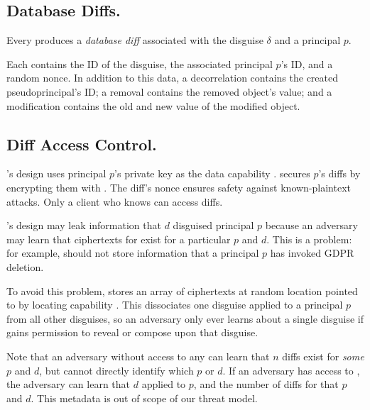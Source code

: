 \subsection{Database Diffs.}
Every  produces a \emph{database diff}  associated with the disguise $\delta$ and a principal $p$. 

Each  contains the ID of the disguise, the associated principal $p$'s ID,
and a random nonce.
%
In addition to this data, a decorrelation  contains the created pseudoprincipal's
ID; a removal  contains the removed object's value; and a modification
 contains the old and new value of the modified object.

\subsection{Diff Access Control.} 

\sys's design uses principal $p$'s private key  as the data capability . \sys
secures $p$'s diffs  by encrypting them with . The diff's nonce ensures safety
against known-plaintext attacks. 
Only a client who knows  can access diffs.

%

\sys's design may leak information that $d$ disguised principal $p$ because an adversary may learn
that ciphertexts for  exist for a particular $p$ and $d$.  This is a problem: for example,
\sys should not store information that a principal $p$ has invoked GDPR deletion.

To avoid this problem, \sys stores an array of  ciphertexts at random location pointed to
by locating capability .  This dissociates one disguise applied to a principal $p$ from
all other disguises, so an adversary only ever learns about a single disguise if \sys gains
permission to reveal or compose upon that disguise.

Note that an adversary without access to any  can learn that $n$ diffs exist for
\emph{some} $p$ and $d$, but cannot directly identify which $p$ or $d$.  If an adversary has access
to , the adversary can learn that $d$ applied to $p$, and the number of  diffs
for that $p$ and $d$. This metadata is out of scope of our threat model.

